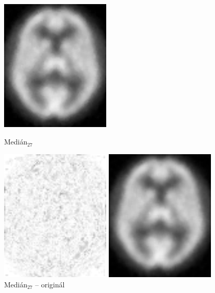     \begin{figure}[htp]
        \begin{minipage}[l]{0.5\textwidth}
            \center
            \includegraphics[width = 150pt]{src/8Appendix/final/10-100med.png}
            \caption{Medián$_{27}$}
        \end{minipage}
        \begin{minipage}[r]{0.5\textwidth}
            \center
            \includegraphics[width = 150pt]{src/8Appendix/final/10-100medD.png}
            \caption{Medián$_{27}$ -- originál}
        \end{minipage}
        \begin{minipage}[l]{0.5\textwidth}
            \center
            \includegraphics[width = 150pt]{src/8Appendix/final/10-100bes.png}

\end{minipage}
\end{figure}
